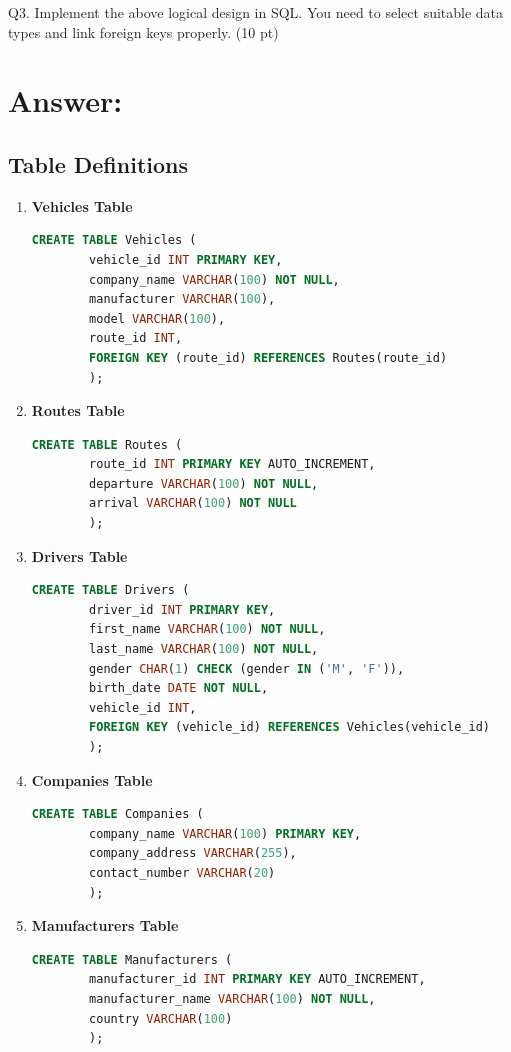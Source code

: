 \documentclass{article}
\begin{document}
Q3. Implement the above logical design in SQL. You need to select
suitable data types and link foreign keys properly. (10 pt)

\section*{Answer:}
\subsection*{Table Definitions}

\begin{enumerate}
	\item \textbf{Vehicles Table}
	\begin{lstlisting}[language=SQL]
		CREATE TABLE Vehicles (
		vehicle_id INT PRIMARY KEY,         
		company_name VARCHAR(100) NOT NULL,   
		manufacturer VARCHAR(100),           
		model VARCHAR(100),                  
		route_id INT,                         
		FOREIGN KEY (route_id) REFERENCES Routes(route_id)
		);
	\end{lstlisting}
	
	\item \textbf{Routes Table}
	\begin{lstlisting}[language=SQL]
		CREATE TABLE Routes (
		route_id INT PRIMARY KEY AUTO_INCREMENT, 
		departure VARCHAR(100) NOT NULL,         
		arrival VARCHAR(100) NOT NULL            
		);
	\end{lstlisting}
	
	\item \textbf{Drivers Table}
	\begin{lstlisting}[language=SQL]
		CREATE TABLE Drivers (
		driver_id INT PRIMARY KEY,             
		first_name VARCHAR(100) NOT NULL,         
		last_name VARCHAR(100) NOT NULL,          
		gender CHAR(1) CHECK (gender IN ('M', 'F')), 
		birth_date DATE NOT NULL,               
		vehicle_id INT,                           
		FOREIGN KEY (vehicle_id) REFERENCES Vehicles(vehicle_id)
		);
	\end{lstlisting}
	
	\item \textbf{Companies Table}
	\begin{lstlisting}[language=SQL]
		CREATE TABLE Companies (
		company_name VARCHAR(100) PRIMARY KEY,    
		company_address VARCHAR(255),             
		contact_number VARCHAR(20)                 
		);
	\end{lstlisting}
	
	\item \textbf{Manufacturers Table}
	\begin{lstlisting}[language=SQL]
		CREATE TABLE Manufacturers (
		manufacturer_id INT PRIMARY KEY AUTO_INCREMENT,  
		manufacturer_name VARCHAR(100) NOT NULL,         
		country VARCHAR(100)                            
		);
	\end{lstlisting}
	

\end{enumerate}
\end{document}
